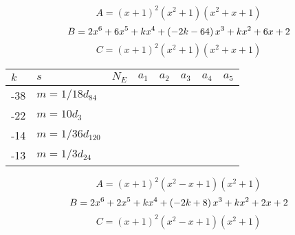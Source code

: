 \documentclass{amsart}
\begin{document}
$$A=(x
 + 1)^{2}(x^2
 + 1)(x^2
 + x
 + 1)$$
$$B=2\*x^6
 + 6\*x^5
 + k\*x^4
 + \left(-2\*k
 - 64\right) \*x^3
 + k\*x^2
 + 6\*x
 + 2$$
$$C=(x
 + 1)^{2}(x^2
 + 1)(x^2
 + x
 + 1)$$
\begin{longtable}{|l|l|l|lllll|}
\hline
$k$ & $s$ & $N_E$ & $a_1$ & $a_2$ & $a_3$ & $a_4$ & $a_5$\\
\hline
-38&$m=1/18d_{84}$&&\multicolumn{5}{c|}{}\\
-22&$m=10d_{3}$&&\multicolumn{5}{c|}{}\\
-14&$m=1/36d_{120}$&&\multicolumn{5}{c|}{}\\
-13&$m=1/3d_{24}$&&\multicolumn{5}{c|}{}\\
\hline
\end{longtable}
$$A=(x
 + 1)^{2}(x^2
 - x
 + 1)(x^2
 + 1)$$
$$B=2\*x^6
 + 2\*x^5
 + k\*x^4
 + \left(-2\*k
 + 8\right) \*x^3
 + k\*x^2
 + 2\*x
 + 2$$
$$C=(x
 + 1)^{2}(x^2
 - x
 + 1)(x^2
 + 1)$$
\end{document}
